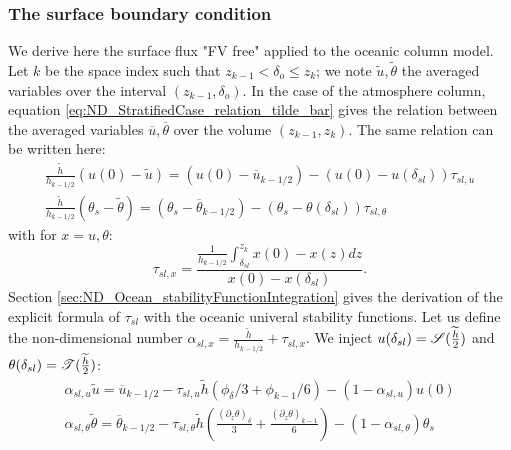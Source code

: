 \subsubsection{The surface boundary condition}
We derive here the surface flux "FV free" applied to the oceanic
column model. Let $k$ be the space index such that
$z_{k-1} < \delta_o \leq z_k$;
we note $\widetilde{u}, \widetilde{\theta}$
the averaged variables over the interval $(z_{k-1}, \delta_o)$.
In the case of the atmosphere column, equation
\eqref{eq:ND_StratifiedCase_relation_tilde_bar}
gives the relation between the averaged variables
$\overline{u}, \overline{\theta}$ over the volume $(z_{k-1}, z_{k})$.
The same relation can be written here:
\begin{equation}
	\label{eq:ND_Ocean_tmprelation_tilde_bar}
\begin{aligned}
	\frac{\widetilde{h}}{h_{k-1/2}} (u(0) - \widetilde{u}) =
	(u(0) - \overline{u}_{k-1/2}) -
	(u(0) - u(\delta_{sl}))\tau_{sl, u} \\
\frac{\widetilde{h}}{h_{k-1/2}} (\theta_s - \widetilde{\theta}) =
	(\theta_s - \overline{\theta}_{k-1/2}) -
	(\theta_s - \theta(\delta_{sl}))\tau_{sl, \theta}
\end{aligned}
\end{equation}
with for $x = u, \theta$:
\begin{equation}
	\tau_{sl, x} = \frac{\frac{1}{{h_{k-1/2}}}\int_{\delta_{sl}}^{z_k} x(0) - x(z)
	dz}{x(0) - x(\delta_{sl})}.
\end{equation}
Section \ref{sec:ND_Ocean_stabilityFunctionIntegration}
gives the derivation of the explicit formula of $\tau_{sl}$
with the oceanic univeral stability functions.
Let us define the non-dimensional number
$\alpha_{sl, x} = \frac{\widetilde{h}}{h_{k-1/2}} +
\tau_{sl, x}$.
We inject $u(\delta_{sl}) =
{\cal S}(\frac{\widetilde{h}}{2})$ and
$\theta(\delta_{sl}) = {\cal T}(\frac{\widetilde{h}}{2})$:
\begin{equation}
\begin{aligned}
\label{eq:ND_Ocean_relation_tilde_bar}
\alpha_{sl, u}\widetilde{u} = \overline{u}_{k-1/2} -
	\tau_{sl, u}
\widetilde{h}
	(\phi_{\delta}/3 + \phi_{k-1}/6) - (1 - \alpha_{sl, u})u(0)\\
\alpha_{sl, \theta}
\widetilde{\theta}
= \overline{\theta}_{k-1/2} - \tau_{sl, \theta}
	\widetilde{h}(\frac{{(\partial_z \theta)}_{\delta}}{3}
	+ \frac{{(\partial_z \theta)}_{k-1}}{6})
 - (1 - \alpha_{sl, \theta})\theta_s
\end{aligned}
\end{equation}
